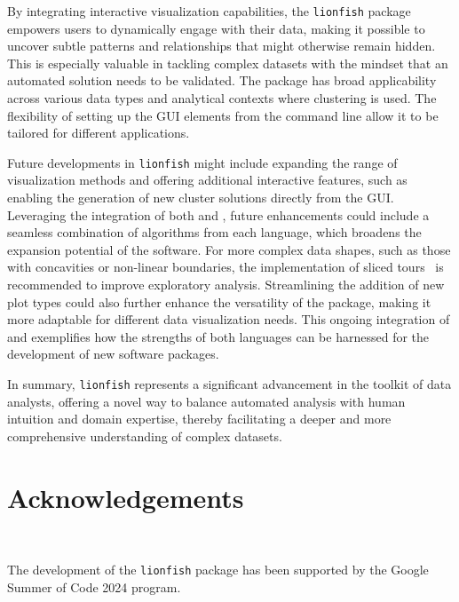 \documentclass[article]{ajs}
\begin{document}
By integrating interactive visualization capabilities, the \texttt{lionfish} package empowers users to dynamically engage with their data, making it possible to uncover subtle patterns and relationships that might otherwise remain hidden. This is especially valuable in tackling complex datasets with the mindset that an automated solution needs to be validated. The package has broad applicability across various data types and analytical contexts where clustering is used. The flexibility of setting up the GUI elements from the command line allow it to be tailored for different applications.


Future developments in \texttt{lionfish} might include expanding the range of visualization methods and offering additional interactive features, such as enabling the generation of new cluster solutions directly from the GUI. Leveraging the integration of both  and , future enhancements could include a seamless combination of algorithms from each language, which broadens the expansion potential of the software. For more complex data shapes, such as those with concavities or non-linear boundaries, the implementation of sliced tours~\citep{Laa2020} is recommended to improve exploratory analysis. Streamlining the addition of new plot types could also further enhance the versatility of the package, making it more adaptable for different data visualization needs. This ongoing integration of  and  exemplifies how the strengths of both languages can be harnessed for the development of new software packages.

In summary, \texttt{lionfish} represents a significant advancement in the toolkit of data analysts, offering a novel way to balance automated analysis with human intuition and domain expertise, thereby facilitating a deeper and more comprehensive understanding of complex datasets.

\section{Acknowledgements}~\label{acknowledgements}

The development of the \texttt{lionfish} package has been supported by the Google Summer of Code 2024 program.

%

\end{document}

